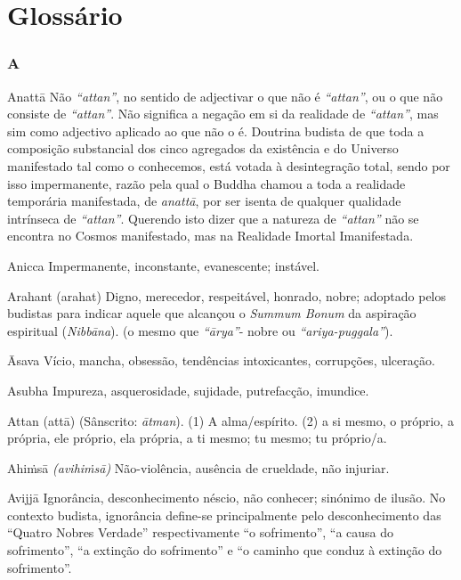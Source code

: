 \chapter{Glossário}

\subsection{A}

\begin{glossarydescription}

\item[Anattā] Não \emph{``attan''}, no sentido de adjectivar o que não é
\emph{``attan''}, ou o que não consiste de \emph{``attan''}. Não significa a
negação em si da realidade de \emph{``attan''}, mas sim como adjectivo
aplicado ao que não o é. Doutrina budista de que toda a composição substancial
dos cinco agregados da existência e do Universo manifestado tal como o
conhecemos, está votada à desintegração total, sendo por isso impermanente,
razão pela qual o Buddha chamou a toda a realidade temporária manifestada, de
\emph{anattā}, por ser isenta de qualquer qualidade intrínseca de
\emph{``attan''}. Querendo isto dizer que a natureza de \emph{``attan''} não
se encontra no Cosmos manifestado, mas na Realidade Imortal Imanifestada.

\item[Anicca] Impermanente, inconstante, evanescente; instável.

\item[Arahant (arahat)] Digno, merecedor, respeitável, honrado, nobre; adoptado
pelos budistas para indicar aquele que alcançou o \emph{Summum Bonum} da
aspiração espiritual (\emph{Nibbāna}). (o mesmo que \emph{``ārya''}- nobre ou
\emph{``ariya-puggala''}).

\item[Āsava] Vício, mancha, obsessão, tendências intoxicantes, corrupções,
ulceração.

\item[Asubha] Impureza, asquerosidade, sujidade, putrefacção, imundice.

\item[Attan (attā)] (Sânscrito: \emph{ātman}). (1) A alma/espírito. (2) a si
mesmo, o próprio, a própria, ele próprio, ela própria, a ti mesmo; tu mesmo; tu
próprio/a.

\item[Ahiṁsā] \emph{(avihiṁsā)} Não-violência, ausência de crueldade, não
injuriar.

\item[Avijjā] Ignorância, desconhecimento néscio, não conhecer; sinónimo de
ilusão. No contexto budista, ignorância define-se principalmente pelo
desconhecimento das ``Quatro Nobres Verdade'' respectivamente ``o sofrimento'',
``a causa do sofrimento'', ``a extinção do sofrimento'' e ``o caminho que conduz
à extinção do sofrimento''.

\end{glossarydescription}

